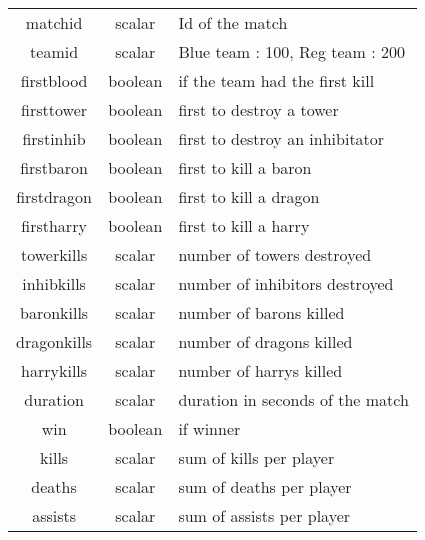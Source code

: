 \begin{longtable}{|c|c|l|}
        \hline
        matchid                     & scalar          & Id of the match \\
        teamid                      & scalar          & Blue team : 100, Reg team : 200 \\
        firstblood                  & boolean         & if the team had the first kill\\
        firsttower                  & boolean         & first to destroy a tower \\
        firstinhib                  & boolean         & first to destroy an inhibitator \\
        firstbaron                  & boolean         & first to kill a baron \\
        firstdragon                 & boolean         & first to kill a dragon \\
        firstharry                  & boolean         & first to kill a harry \\
        towerkills                  & scalar          & number of towers destroyed\\
        inhibkills                  & scalar          & number of inhibitors destroyed\\
        baronkills                  & scalar          & number of barons killed\\
        dragonkills                 & scalar          & number of dragons killed\\
        harrykills                  & scalar          & number of harrys killed\\
        duration                    & scalar          & duration in seconds of the match\\
        win                         & boolean         & if winner \\
        kills                       & scalar          & sum of kills per player\\
        deaths                      & scalar          & sum of deaths per player\\
        assists                     & scalar          & sum of assists per player\\
        

\end{longtable}
